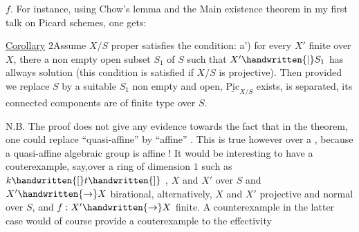 $f$. For instance, using Chow's lemma and the Main existence theorem in my first talk on Picard schemes, one gets:

\uline{Corollary} 2\quad Assume $X/S$ proper satisfies the condition:  a') for every $X'$ finite over $X$, there  a non empty open subset $S_1$ of $S$ such that  $X'\handwritten{\mid}S_1$ has allways solution  (this condition is satisfied if $X/S$ is projective). Then  provided we replace $S$ by a suitable $S_1$ non empty and open, $\underline{\mathrm{Pic}}_{X/S}$ exists, is separated, its connected components are of finite type over $S$.

N.B. The proof does not give any evidence towards the fact that in the theorem, one could replace ``quasi-affine'' by ``affine'' . This is true however over a , because a quasi-affine algebraic group is affine ! It would be interesting to have a couterexample, say,over a  ring of dimension $1$ such as $k\handwritten{[}t\handwritten{]}$ , $X$ and $X'$
over $S$ and $X'\handwritten{\to}X$ birational, alternatively,  $X$ and $X'$ projective and normal over $S$, and $f:X'\handwritten{\to}X$ finite. A counterexample in the latter case would of course provide a couterexample to the effectivity

